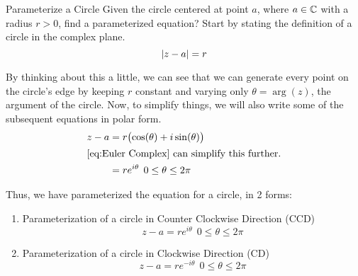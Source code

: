 \begin{example}{Parameterize a Circle}
  Given the circle centered at point $a$, where $a \in \operatorname{\mathbb{C}}$ with a radius $r > 0$, find a parameterized equation?
  \tcblower{}
  Start by stating the definition of a circle in the complex plane.
  \begin{equation*}
    \lvert z-a \rvert = r
  \end{equation*}

  By thinking about this a little, we can see that we can generate every point on the circle's edge by keeping $r$ constant and varying only $\theta = \arg(z)$, the argument of the circle.
  Now, to simplify things, we will also write some of the subsequent equations in polar form.
  \begin{align*}
    z - a &= r \bigl( \cos(\theta) + i \sin(\theta) \bigr) \\
    \shortintertext{\Cref{eq:Euler Complex} can simplify this further.}
          &= r e^{i \theta} \:\: 0 \leq \theta \leq 2\pi
  \end{align*}

  Thus, we have parameterized the equation for a circle, in 2 forms:
  \begin{enumerate}[noitemsep]
  \item Parameterization of a circle in Counter Clockwise Direction (CCD)
    \begin{equation*}
      z - a = r e^{i \theta} \:\: 0 \leq \theta \leq 2\pi
    \end{equation*}
  \item Parameterization of a circle in Clockwise Direction (CD)
    \begin{equation*}
      z - a = r e^{-i \theta} \:\: 0 \leq \theta \leq 2\pi
    \end{equation*}
  \end{enumerate}
\end{example}

